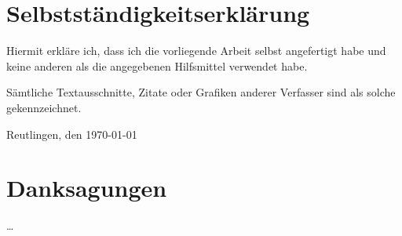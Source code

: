 
\section*{Selbstständigkeitserklärung}

Hiermit erkläre ich, dass ich die vorliegende 
Arbeit selbst angefertigt habe und keine anderen 
als die angegebenen Hilfsmittel verwendet habe.

Sämtliche Textausschnitte, Zitate oder Grafiken 
anderer Verfasser sind als solche gekennzeichnet.

\vspace{3\baselineskip}

Reutlingen, den \today \hspace{0.25\linewidth}\parbox{0.3\linewidth}{\dotfill}


\section*{Danksagungen}
\dots
